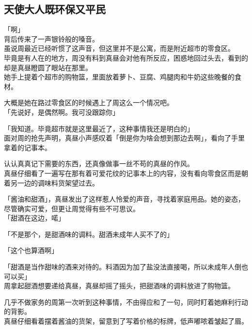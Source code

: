 \subsection{天使大人既环保又平民}

「啊」\\

背后传来了一声银铃般的嗓音。\\

虽说周最近已经听惯了这声音，但这里并不是公寓，而是附近超市的零食区。\\

毕竟是有人在的地方，周没有料到真昼会对他有所反应，困惑地回过头去，看到的却是真昼瞪圆了眼站在那里。\\

她手上提着个超市的购物篮，里面放着萝卜、豆腐、鸡腿肉和牛奶这些晚餐的食材。

大概是她在路过零食区的时候遇上了周这么一个情况吧。\\

「先说好，是偶然啊。我可没跟踪你」

「我知道。毕竟超市就是这里最近了，这种事情我还是明白的」\\

面对周的抢先声明，真昼小声感叹着「倒是你为啥会想到那边去啊」，看向了手里拿着的记事本。

认认真真记下需要的东西，还真像做事一丝不苟的真昼的作风。\\

真昼仔细看了一遍写在那有着可爱花纹的记事本上的内容，没有看向零食区而是朝着另一边的调味料货架望过去。

「酱油和甜酒」，真昼发出了这样惹人怜爱的声音，寻找着家庭用品。她的姿态，尽管确实可爱，但更让周觉得有些不可思议。\\

「甜酒在这边，喏」

「不是那个，是甜酒味的调料。甜酒未成年人买不了的」

「这个也算酒啊」

「甜酒是当作甜味的酒来对待的。料酒因为加了盐没法直接喝，所以未成年人倒也可以买」\\

周拿起甜酒想要递给真昼，真昼却摇了摇头，把甜酒味的调料放进了购物篮。

几乎不做家务的周第一次听到这种事情，不由得应和了一句，同时盯着她麻利行动的背影。\\

真昼仔细看着摆着酱油的货架，留意到了写着价格的标牌，低声嘟哝着皱起了眉。\\

